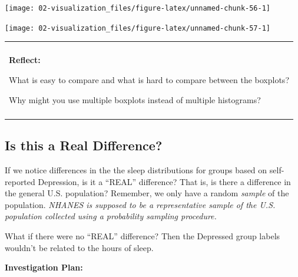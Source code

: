 \documentclass[
]{book}
\newenvironment{Shaded}{\begin{snugshade}}{\end{snugshade}}
\newcommand{\DataTypeTok}[1]{\textcolor[rgb]{0.13,0.29,0.53}{#1}}
\newcommand{\KeywordTok}[1]{\textcolor[rgb]{0.13,0.29,0.53}{\textbf{#1}}}
\newcommand{\NormalTok}[1]{#1}
\newcommand{\OperatorTok}[1]{\textcolor[rgb]{0.81,0.36,0.00}{\textbf{#1}}}
\newcommand{\StringTok}[1]{\textcolor[rgb]{0.31,0.60,0.02}{#1}}
\newenvironment{reflect}
{
    \begin{center}
    
    \begin{tabular}{|p{0.8\textwidth}|}
    \rowcolor{LightBlue}
    \hline\\
    \rowcolor{LightBlue}
    \textbf{Reflect:}
}
{
    \\\rowcolor{LightBlue}
    \\\hline
    \end{tabular} 
    \end{center}
}
\begin{document}
\begin{center}\texttt{[image: 02-visualization\_files/figure-latex/unnamed-chunk-56-1]} \end{center}

\begin{Shaded}
\end{Shaded}

\begin{center}\texttt{[image: 02-visualization\_files/figure-latex/unnamed-chunk-57-1]} \end{center}

\begin{reflect}
What is easy to compare and what is hard to compare between the
boxplots?

Why might you use multiple boxplots instead of multiple histograms?
\end{reflect}

\hypertarget{is-this-a-real-difference}{%
\subsection{Is this a Real Difference?}\label{is-this-a-real-difference}}

If we notice differences in the the sleep distributions for groups based on self-reported Depression, is it a ``REAL'' difference? That is, is there a difference in the general U.S. population? Remember, we only have a random \emph{sample} of the population. \emph{NHANES is supposed to be a representative sample of the U.S. population collected using a probability sampling procedure.}

What if there were no ``REAL'' difference? Then the Depressed group labels wouldn't be related to the hours of sleep.

\textbf{Investigation Plan:}
\end{document}
